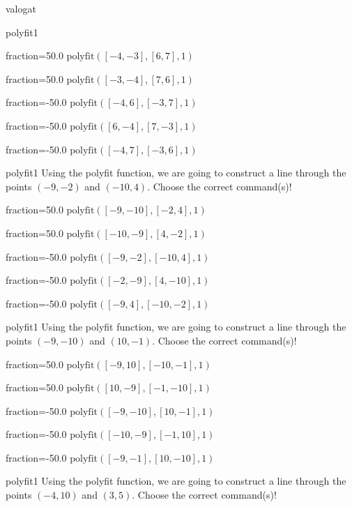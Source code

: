 \documentclass[12pt]{article}
\begin{document}
\begin{quiz}{valogat}
\begin{multi}[multiple]{polyfit1}
\item[fraction=50.0] $\mathrm{polyfit}([-4,-3], [6,7], 1)$
\item[fraction=50.0] $\mathrm{polyfit}([-3,-4], [7,6], 1)$
\item[fraction=-50.0]  $\mathrm{polyfit}([-4,6], [-3,7], 1)$
\item[fraction=-50.0]  $\mathrm{polyfit}([6,-4], [7,-3], 1)$
\item[fraction=-50.0]  $\mathrm{polyfit}([-4,7], [-3,6], 1)$
\end{multi}
\begin{multi}[multiple]{polyfit1}
Using the polyfit function, we are going to construct a line through the points $\left(-9,-2\right)$ and $\left(-10,4\right)$.
Choose the correct command(s)!

\item[fraction=50.0] $\mathrm{polyfit}([-9,-10], [-2,4], 1)$
\item[fraction=50.0] $\mathrm{polyfit}([-10,-9], [4,-2], 1)$
\item[fraction=-50.0]  $\mathrm{polyfit}([-9,-2], [-10,4], 1)$
\item[fraction=-50.0]  $\mathrm{polyfit}([-2,-9], [4,-10], 1)$
\item[fraction=-50.0]  $\mathrm{polyfit}([-9,4], [-10,-2], 1)$
\end{multi}
\begin{multi}[multiple]{polyfit1}
Using the polyfit function, we are going to construct a line through the points $\left(-9,-10\right)$ and $\left(10,-1\right)$.
Choose the correct command(s)!

\item[fraction=50.0] $\mathrm{polyfit}([-9,10], [-10,-1], 1)$
\item[fraction=50.0] $\mathrm{polyfit}([10,-9], [-1,-10], 1)$
\item[fraction=-50.0]  $\mathrm{polyfit}([-9,-10], [10,-1], 1)$
\item[fraction=-50.0]  $\mathrm{polyfit}([-10,-9], [-1,10], 1)$
\item[fraction=-50.0]  $\mathrm{polyfit}([-9,-1], [10,-10], 1)$
\end{multi}
\begin{multi}[multiple]{polyfit1}
Using the polyfit function, we are going to construct a line through the points $\left(-4,10\right)$ and $\left(3,5\right)$.
Choose the correct command(s)!


\end{multi}
\end{quiz}
\end{document}
